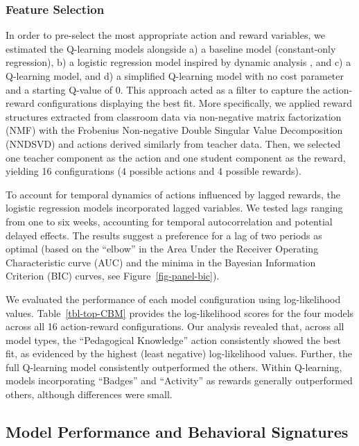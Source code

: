 \documentclass[
  number,
  preprint,
  3p,
  onecolumn]{elsarticle}
\begin{document}
\subsubsection{Feature Selection}\label{feature-selection}

In order to pre-select the most appropriate action and reward variables,
we estimated the Q-learning models alongside a) a baseline model
(constant-only regression), b) a logistic regression model inspired by
dynamic analysis \citep{lau2005}, and c) a Q-learning model, and d) a
simplified Q-learning model with no cost parameter and a starting
Q-value of 0. This approach acted as a filter to capture the
action-reward configurations displaying the best fit. More specifically,
we applied reward structures extracted from classroom data via
non-negative matrix factorization (NMF) with the Frobenius Non-negative
Double Singular Value Decomposition (NNDSVD) and actions derived
similarly from teacher data. Then, we selected one teacher component as
the action and one student component as the reward, yielding 16
configurations (4 possible actions and 4 possible rewards).

To account for temporal dynamics of actions influenced by lagged
rewards, the logistic regression models incorporated lagged variables.
We tested lags ranging from one to six weeks, accounting for temporal
autocorrelation and potential delayed effects. The results suggest a
preference for a lag of two periods as optimal (based on the ``elbow''
in the Area Under the Receiver Operating Characteristic curve (AUC) and
the minima in the Bayesian Information Criterion (BIC) curves, see
Figure~\ref{fig-panel-bic}).

We evaluated the performance of each model configuration using
log-likelihood values. Table~\ref{tbl-top-CBM} provides the
log-likelihood scores for the four models across all 16 action-reward
configurations. Our analysis revealed that, across all model types, the
``Pedagogical Knowledge'' action consistently showed the best fit, as
evidenced by the highest (least negative) log-likelihood values.
Further, the full Q-learning model consistently outperformed the others.
Within Q-learning, models incorporating ``Badges'' and ``Activity'' as
rewards generally outperformed others, although differences were small.

\subsection{Model Performance and Behavioral
Signatures}\label{model-performance-and-behavioral-signatures}
\end{document}
